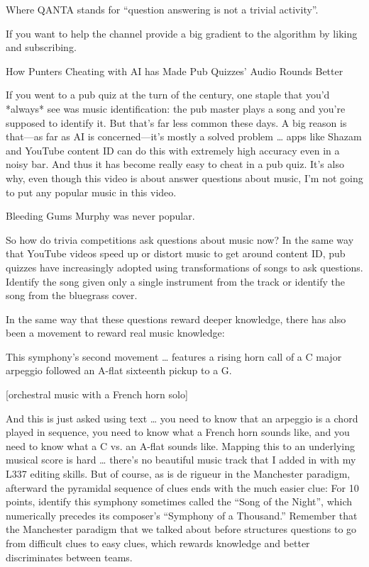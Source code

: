 Where QANTA stands for “question answering is not a trivial activity”.

If you want to help the channel provide a big gradient to the algorithm by liking and subscribing.


How Punters Cheating with AI has Made Pub Quizzes' Audio Rounds Better

If you went to a pub quiz at the turn of the century, one staple that you’d *always* see was music identification: the pub master plays a song and you’re supposed to identify it.  But that’s far less common these days.  A big reason is that—as far as AI is concerned—it’s mostly a solved problem … apps like Shazam and YouTube content ID can do this with extremely high accuracy even in a noisy bar.  And thus it has become really easy to cheat in a pub quiz.  It’s also why, even though this video is about answer questions about music, I’m not going to put any popular music in this video. 

Bleeding Gums Murphy was never popular.


So how do trivia competitions ask questions about music now?  In the same way that YouTube videos speed up or distort music to get around content ID, pub quizzes have increasingly adopted using transformations of songs to ask questions.  Identify the song given only a single instrument from the track or identify the song from the bluegrass cover.

In the same way that these questions reward deeper knowledge, there has also been a movement to reward real music knowledge:  

This symphony’s second movement … features a rising horn call of a C major arpeggio followed an A-flat sixteenth pickup to a G. 

[orchestral music with a French horn solo]


And this is just asked using text … you need to know that an arpeggio is a chord played in sequence, you need to know what a French horn sounds like, and you need to know what a C vs. an A-flat sounds like.  Mapping this to an underlying musical score is hard … there’s no beautiful music track that I added in with my L337 editing skills.  But of course, as is de rigueur in the Manchester paradigm, afterward the pyramidal sequence of clues ends with the much easier clue:
For 10 points, identify this symphony sometimes called the “Song of the Night”, which numerically precedes its composer’s “Symphony of a Thousand.”
Remember that the Manchester paradigm that we talked about before structures questions to go from difficult clues to easy clues, which rewards knowledge and better discriminates between teams.

